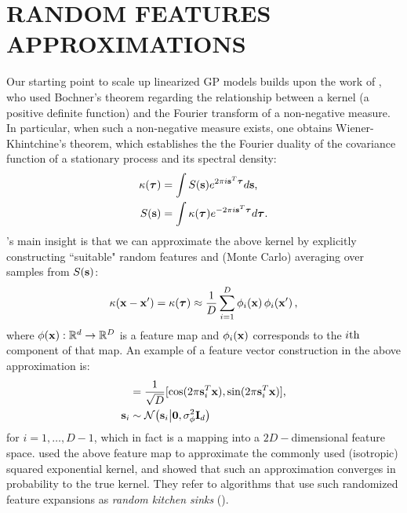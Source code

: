\section{RANDOM FEATURES APPROXIMATIONS}
%
Our starting point to scale up linearized GP models builds upon the work of 
\citeauthor{rahimi-recht-nips-2007} \citeyearpar{rahimi-recht-nips-2007,rahimi-recht-nips-2008},  
who used Bochner's theorem regarding the relationship between 
a kernel (a positive definite function) and the Fourier transform of a non-negative measure. In particular, 
when such a non-negative measure exists, one obtains  Wiener-Khintchine's theorem, which establishes the 
 the Fourier duality of the covariance function of a stationary  process and its spectral density:
\begin{align}
	\label{eq:fourier}
	\kappa(\boldsymbol{ \tau }) &= \int S(\mathbf{s}) e^{2 \pi i \mathbf{s}^T  \boldsymbol{ \tau } } d \mathbf{s} \text{,} \\
	S(\mathbf{s}) &= \int \kappa(\boldsymbol{ \tau }) e^{- 2 \pi i \mathbf{s}^T \boldsymbol{ \tau } }  d \boldsymbol{ \tau } \text{.}
\end{align}
\citeauthor{rahimi-recht-nips-2007}'s  main insight  \citeyearpar{rahimi-recht-nips-2007} 
is that we can approximate the above kernel by explicitly constructing 
``suitable" random features and (Monte Carlo) averaging over samples from $S(\mathbf{s})$: 
\begin{equation}
	\label{eq:mcapprox}
	 \kappa(\mathbf{x}-\mathbf{x}^\prime) = \kappa(\boldsymbol{ \tau }) 
	\approx \frac{1}{D} \sum_{i=1}^{D} \phi_{i}\!\left({{\mathbf{x}}}\right) \phi_{i}\!\left({{\mathbf{x}^\prime}}\right)  \text{,}
\end{equation}
where $\phi\!\left({{\mathbf{x}}}\right): \mathbb{R}^{d} \to \mathbb{R}^{D}$ is a feature map and 
$\phi_{i}\!\left({{\mathbf{x}}}\right)$ corresponds to the $i\mathrm{th}$ component of that map.
%
An example of a feature vector construction in the above approximation is:
\begin{align}
	[\singlefeatfunc{\x}{i} ,\singlefeatfunc{\x}{i+1} ] &= \frac{1}{\sqrt{D}} [ \cos(2 \pi \ffourier_i^T \x) , \sin(2 \pi \ffourier_i^T \ins) ] \text{,}\\
		\ffourier_i & \sim \gausC{\ffourier_i}{\vec{0}, \varfeat \ident{d}} 
\end{align}
for $i=1, \ldots, D-1$,  which in fact is a mapping into a $2 D-$dimensional feature space. 
\citet{rahimi-recht-nips-2007} used the above feature map to approximate the commonly used 
(isotropic) squared exponential kernel, and showed that such an approximation converges in probability 
to the true kernel. They refer to algorithms that use such randomized feature expansions 
as \emph{random kitchen sinks} (\rks).  

